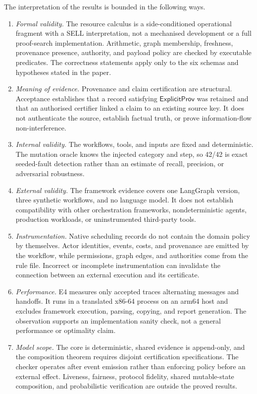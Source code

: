 \documentclass[a4paper,fleqn]{cas-sc}
\begin{document}
The interpretation of the results is bounded in the following ways.
\begin{enumerate}
  \item \emph{Formal validity.} The resource calculus is a side-conditioned
  operational fragment with a SELL interpretation, not a mechanised
  development or a full proof-search implementation. Arithmetic, graph
  membership, freshness, provenance presence, authority, and payload policy are
  checked by executable predicates. The correctness statements apply only to
  the six schemas and hypotheses stated in the paper.
  \item \emph{Meaning of evidence.} Provenance and claim certification are
  structural. Acceptance establishes that a record satisfying
  \(\mathsf{ExplicitProv}\) was
  retained and that an authorised certifier linked a claim to an existing
  source key. It does not authenticate the source, establish factual truth, or
  prove information-flow non-interference.
  \item \emph{Internal validity.} The workflows, tools, and inputs are fixed and
  deterministic. The mutation oracle knows the injected category and step, so
  42/42 is exact seeded-fault detection rather than an estimate of recall,
  precision, or adversarial robustness.
  \item \emph{External validity.} The framework evidence covers one LangGraph
  version, three synthetic workflows, and no language model. It does not
  establish compatibility with other orchestration frameworks, nondeterministic
  agents, production workloads, or uninstrumented third-party tools.
  \item \emph{Instrumentation.} Native scheduling records do not contain the
  domain policy by themselves. Actor identities, events, costs, and provenance
  are emitted by the workflow, while permissions, graph edges, and authorities
  come from the rule file. Incorrect or incomplete instrumentation can
  invalidate the connection between an external execution and its certificate.
  \item \emph{Performance.} E4 measures only accepted traces alternating
  messages and handoffs. It runs in a translated x86-64 process on an arm64
  host and excludes framework execution, parsing, copying, and report
  generation. The observation supports an implementation sanity check, not a
  general performance or optimality claim.
  \item \emph{Model scope.} The core is deterministic, shared evidence is
  append-only, and the composition theorem requires disjoint certification
  specifications. The checker operates after event emission rather than
  enforcing policy before an external effect. Liveness, fairness, protocol
  fidelity, shared mutable-state composition, and probabilistic verification
  are outside the proved results.
\end{enumerate}
\end{document}
